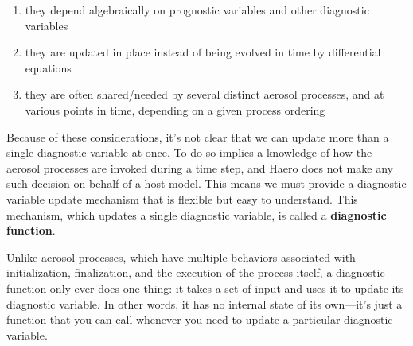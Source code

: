 \begin{enumerate}
  \item they depend algebraically on prognostic variables and other diagnostic
        variables
  \item they are updated in place instead of being evolved in time by
        differential equations
  \item they are often shared/needed by several distinct aerosol processes, and
        at various points in time, depending on a given process ordering
\end{enumerate}

Because of these considerations, it's not clear that we can update more than a
single diagnostic variable at once. To do so implies a knowledge of how the
aerosol processes are invoked during a time step, and Haero does not make any
such decision on behalf of a host model. This means we must provide a diagnostic
variable update mechanism that is flexible but easy to understand. This
mechanism, which updates a single diagnostic variable, is called a
{\bf diagnostic function}.

Unlike aerosol processes, which have multiple behaviors associated with
initialization, finalization, and the execution of the process itself, a
diagnostic function only ever does one thing: it takes a set of input and
uses it to update its diagnostic variable. In other words, it has no internal
state of its own---it's just a function that you can call whenever you need
to update a particular diagnostic variable.



